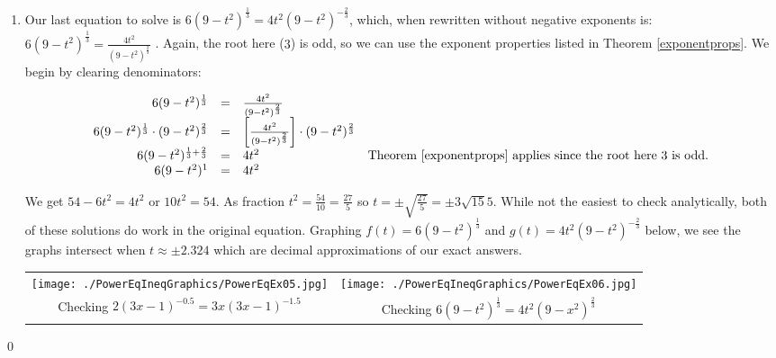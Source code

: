 \documentclass{ximera}
\begin{document}
\begin{example}
\begin{enumerate}
\item  Our last equation to solve is $6(9-t^2)^{\frac{1}{3}} = 4t^2 (9-t^2)^{-\frac{2}{3}}$, which, when rewritten without negative exponents is: $6(9-t^2)^{\frac{1}{3}} = \frac{4t^2}{(9-t^2)^{\frac{2}{3}}}$  .   Again, the root here ($3$) is odd, so we can use the exponent properties listed in Theorem \ref{exponentprops}.   We begin by clearing denominators: 


\[ \begin{array}{rclr}

6(9-t^2)^{\frac{1}{3}} & = & \frac{4t^2}{(9-t^2)^{\frac{2}{3}}} & \\

6(9-t^2)^{\frac{1}{3}} \cdot (9-t^2)^{\frac{2}{3}} & = & \left[   \frac{4t^2}{(9-t^2)^{\frac{2}{3}}}  \right ] \cdot (9-t^2)^{\frac{2}{3}} & \\

6(9-t^2)^{\frac{1}{3} + \frac{2}{3}}& = & 4t^2 &  \text{Theorem \ref{exponentprops} applies since the root here $3$ is odd.} \\

6(9-t^2)^{1} & = & 4t^2 &\\   \end{array} \]

We get $54 - 6t^2 = 4t^2$ or $10t^2 = 54$.  As fraction $t^2 = \frac{54}{10} = \frac{27}{5}$ so $t = \pm \sqrt{\frac{27}{5}} = \pm 3 \sqrt{15}{5}$.  While not the easiest to check analytically, both of these solutions do work in the original equation.  Graphing $f(t) = 6(9-t^2)^{\frac{1}{3}} $ and $g(t) =  4t^2 (9-t^2)^{-\frac{2}{3}}$ below, we see the graphs intersect when $t \approx \pm 2.324$ which are decimal approximations of our exact answers.

\begin{center}

\begin{tabular}{cc}

\texttt{[image: ./PowerEqIneqGraphics/PowerEqEx05.jpg]} & \texttt{[image: ./PowerEqIneqGraphics/PowerEqEx06.jpg]} \\

Checking $2(3x-1)^{-0.5}  = 3x (3x-1)^{-1.5}$  & Checking  $6(9-t^2)^{\frac{1}{3}} = 4t^2 (9-x^2)^{\frac{2}{3}}$ \\

\end{tabular}

\end{center} 

\end{enumerate}

\qed

\end{example}
\end{document}
